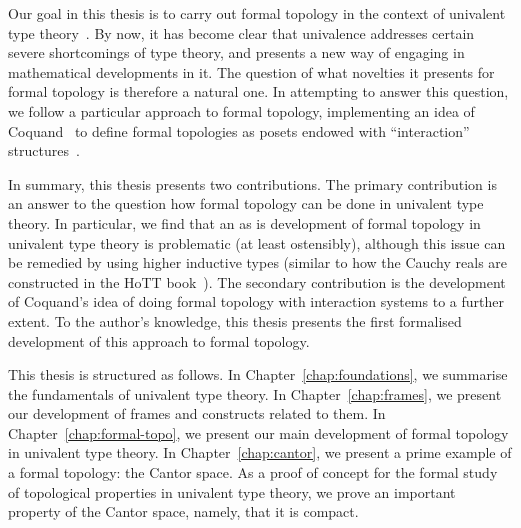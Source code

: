 Our goal in this thesis is to carry out formal topology in the context of univalent type
theory~\cite{hottbook, escardo-uf-intro}. By now, it has become clear that univalence
addresses certain severe shortcomings of type theory, and presents a new way of engaging
in mathematical developments in it. The question of what novelties it presents for formal
topology is therefore a natural one. In attempting to answer this question, we follow a
particular approach to formal topology, implementing an idea of Coquand~\cite{coq-posets}
to define formal topologies as posets endowed with ``interaction''
structures~\cite{tree-sets, hancock-interaction-systems}.

In summary, this thesis presents two contributions. The primary contribution is an answer
to the question how formal topology can be done in univalent type theory. In particular,
we find that an as is development of formal topology in univalent type theory is
problematic (at least ostensibly), although this issue can be remedied by using higher
inductive types (similar to how the Cauchy reals are constructed in the HoTT
book~\cite{hottbook}). The secondary contribution is the development of Coquand's idea of
doing formal topology with interaction systems to a further extent. To the author's
knowledge, this thesis presents the first formalised development of this approach to
formal topology.

This thesis is structured as follows. In Chapter~\ref{chap:foundations}, we summarise the
fundamentals of univalent type theory. In Chapter~\ref{chap:frames}, we present our
development of frames and constructs related to them. In Chapter~\ref{chap:formal-topo},
we present our main development of formal topology in univalent type theory. In
Chapter~\ref{chap:cantor}, we present a prime example of a formal topology: the Cantor
space. As a proof of concept for the formal study of topological properties in univalent
type theory, we prove an important property of the Cantor space, namely, that it is
compact.
